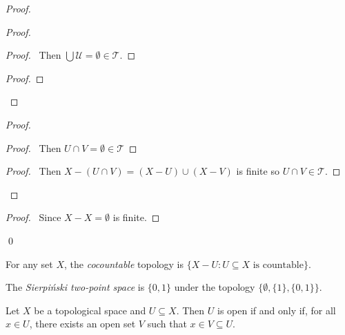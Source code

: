 \begin{proof}
\pf
{}
\begin{proof}
	\begin{proof}
		\pf\ Then $\bigcup \mathcal{U} = \emptyset \in \mathcal{T}$.
	\end{proof}
	\begin{proof}
	\end{proof}
\end{proof}
\begin{proof}
	\begin{proof}
		\pf\ Then $U \cap V = \emptyset \in \mathcal{T}$
	\end{proof}
	\begin{proof}
		\pf\ Then $X - (U \cap V) = (X - U) \cup (X - V)$ is finite so $U \cap V \in \mathcal{T}$.
	\end{proof}
\end{proof}
\begin{proof}
	\pf\ Since $X - X = \emptyset$ is finite.
\end{proof}
\qed
\end{proof}

\begin{df}
For any set $X$, the \emph{cocountable} topology is $\{ X - U : U \subseteq X \text{ is countable} \}$.
\end{df}

\begin{df}
The \emph{Sierpi\'{n}ski two-point space} is $\{0,1\}$ under the topology $\{ \emptyset, \{1\}, \{0,1\} \}$.
\end{df}

\begin{prop}
Let $X$ be a topological space and $U \subseteq X$. Then $U$ is open if and only if, for all $x \in U$, there exists an open set $V$ such that $x \in V \subseteq U$.
\end{prop}

